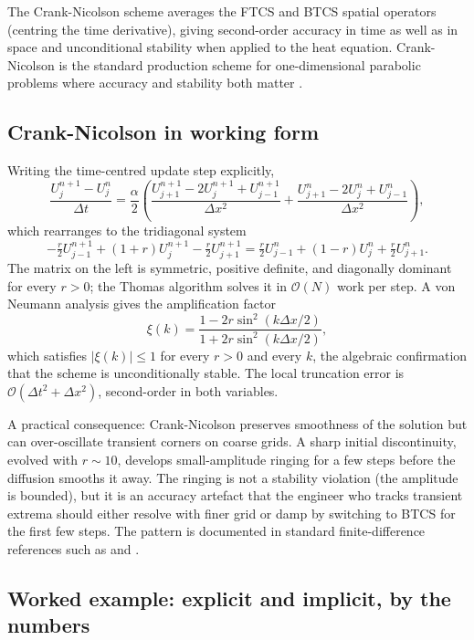 The Crank-Nicolson scheme averages the FTCS and BTCS spatial
operators (centring the time derivative), giving second-order
accuracy in time as well as in space and unconditional stability
when applied to the heat equation. Crank-Nicolson is the standard
production scheme for one-dimensional parabolic problems where
accuracy and stability both matter \cite{paper:v2ch12-crank-nicolson-1947}.

\subsection{Crank-Nicolson in working form}

Writing the time-centred update step explicitly,
\[
\frac{U_{j}^{n+1} - U_{j}^{n}}{\Delta t} = \frac{\alpha}{2} \left(\frac{U_{j+1}^{n+1} - 2 U_{j}^{n+1} + U_{j-1}^{n+1}}{\Delta x^{2}} + \frac{U_{j+1}^{n} - 2 U_{j}^{n} + U_{j-1}^{n}}{\Delta x^{2}}\right),
\]
which rearranges to the tridiagonal system
\[
-\tfrac{r}{2} U_{j-1}^{n+1} + (1 + r) U_{j}^{n+1} - \tfrac{r}{2} U_{j+1}^{n+1} = \tfrac{r}{2} U_{j-1}^{n} + (1 - r) U_{j}^{n} + \tfrac{r}{2} U_{j+1}^{n}.
\]
The matrix on the left is symmetric, positive definite, and
diagonally dominant for every $r > 0$; the Thomas algorithm
solves it in $\mathcal{O}(N)$ work per step. A von Neumann
analysis gives the amplification factor
\[
\xi(k) = \frac{1 - 2 r \sin^{2}(k \Delta x / 2)}{1 + 2 r \sin^{2}(k \Delta x / 2)},
\]
which satisfies $|\xi(k)| \leq 1$ for every $r > 0$ and every $k$,
the algebraic confirmation that the scheme is unconditionally
stable. The local truncation error is
$\mathcal{O}(\Delta t^{2} + \Delta x^{2})$, second-order in both
variables.

A practical consequence: Crank-Nicolson preserves smoothness of
the solution but can over-oscillate transient corners on coarse
grids. A sharp initial discontinuity, evolved with $r \sim 10$,
develops small-amplitude ringing for a few steps before the
diffusion smooths it away. The ringing is not a stability
violation (the amplitude is bounded), but it is an accuracy
artefact that the engineer who tracks transient extrema should
either resolve with finer grid or damp by switching to BTCS for
the first few steps. The pattern is documented in standard
finite-difference references such as
\textcite{text:v2ch12-leveque-fdm} and
\textcite{text:v2ch12-morton-mayers}.



\subsection{Worked example: explicit and implicit, by the numbers}

